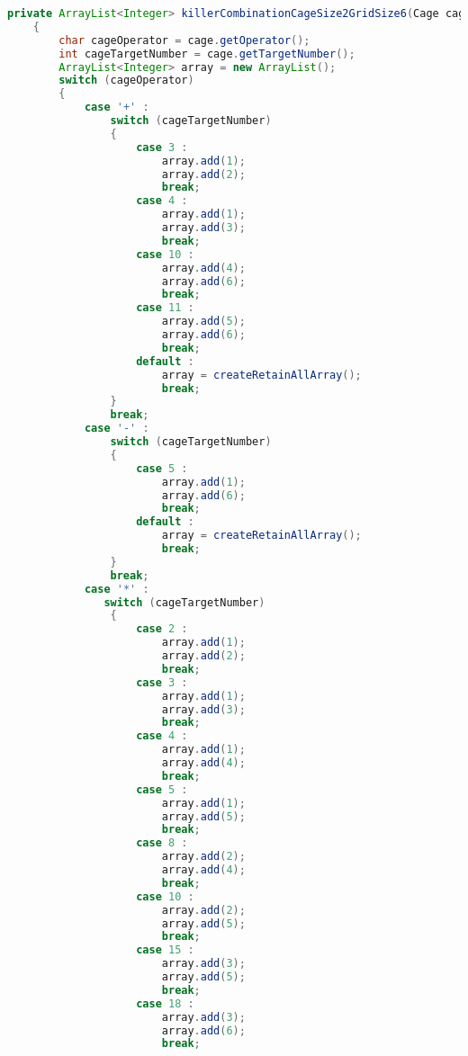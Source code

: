 \begin{lstlisting}[language=Java,basicstyle=\tiny,caption=SolverRuleBased.java]
    private ArrayList<Integer> killerCombinationCageSize2GridSize6(Cage cage)
    {
        char cageOperator = cage.getOperator();
        int cageTargetNumber = cage.getTargetNumber();
        ArrayList<Integer> array = new ArrayList();
        switch (cageOperator)
        {
            case '+' :
                switch (cageTargetNumber)
                {
                    case 3 :
                        array.add(1);
                        array.add(2);
                        break;
                    case 4 :  
                        array.add(1);
                        array.add(3);
                        break;
                    case 10 :
                        array.add(4);
                        array.add(6);
                        break;
                    case 11 :
                        array.add(5);
                        array.add(6);
                        break;
                    default :
                        array = createRetainAllArray();
                        break;
                }
                break;
            case '-' :
                switch (cageTargetNumber)
                {
                    case 5 :
                        array.add(1);
                        array.add(6);
                        break;
                    default :
                        array = createRetainAllArray();
                        break;
                }
                break;
            case '*' :
               switch (cageTargetNumber)
                {
                    case 2 :
                        array.add(1);
                        array.add(2);
                        break;
                    case 3 :
                        array.add(1);
                        array.add(3);
                        break;
                    case 4 :
                        array.add(1);
                        array.add(4);
                        break;
                    case 5 :
                        array.add(1);
                        array.add(5);
                        break;
                    case 8 :
                        array.add(2);
                        array.add(4);
                        break;
                    case 10 :
                        array.add(2);
                        array.add(5);
                        break;
                    case 15 :
                        array.add(3);
                        array.add(5);
                        break;
                    case 18 :
                        array.add(3);
                        array.add(6);
                        break;

\end{lstlisting}
